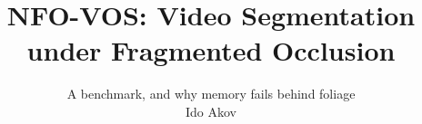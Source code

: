 %

\providecommand{\DeclareUnicodeCharacter}[2]{} %

\usepackage{amssymb} %
\usetikzlibrary{arrows.meta,positioning,calc,fit,backgrounds,shapes.geometric}

\renewcommand{\PersonTitel}{}
\renewcommand{\PersonVorname}{Ido}
\renewcommand{\PersonNachname}{Akov}
\renewcommand{\LehrstuhlName}{Computer Vision Group}
\renewcommand{\PraesentationFusszeileZusatz}{}

\title{NFO-VOS: Video Segmentation under Fragmented Occlusion}
\newcommand{\Untertitel}{A benchmark, and why memory fails behind foliage}
\author{{\PraesentationSchriftgroesseGross\selectfont\Untertitel}\\[8mm]Ido Akov}
\date{}
\subject{Video object segmentation under fragmented occlusion}

